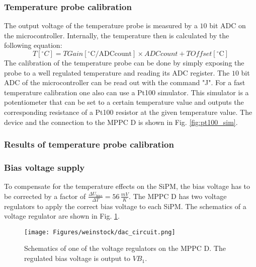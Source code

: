 \documentclass[]{article}
\begin{document}
\subsubsection*{Temperature probe calibration}

The output voltage of the temperature probe is measured by a $10$ bit ADC on the microcontroller. Internally, the temperature then is calculated by the following equation:
\begin{equation}
	T[^{\circ}C] = TGain[^{\circ}\text{C/ADCcount}] \times ADCcount + TOffset[^{\circ}\text{C}]
\end{equation}
The calibration of the temperature probe can be done by simply exposing the probe to a well regulated temperature and reading its ADC register. The $10$ bit ADC of the microcontroller
can be read out with the command "J". For a fast temperature calibration one also can use a Pt100 simulator. This simulator is a potentiometer that can be set to a certain 
temperature value and outputs the corresponding resistance of a Pt100 resistor at the given temperature value. The device and the connection to the MPPC D is shown in Fig. \ref{fig:pt100_sim}.

\subsubsection*{Results of temperature probe calibration}



\newpage

\subsubsection{Bias voltage supply}

To compensate for the temperature effects on the SiPM, the bias voltage has to be corrected by a factor of $\frac{\Delta U_{bias}}{\Delta T} = 56\,\frac{mV}{K}$. The MPPC D has two 
voltage regulators to apply the correct bias voltage to each SiPM. The schematics of a voltage regulator are shown in Fig. \ref{voltage_regulator}. 
	
	\begin{figure}[t]
		\centering
			\texttt{[image: Figures/weinstock/dac\_circuit.png]}
		\caption{Schematics of one of the voltage regulators on the MPPC D. The regulated bias voltage is output to $VB_1$.}
		\label{voltage_regulator}
	\end{figure}	
\end{document}
